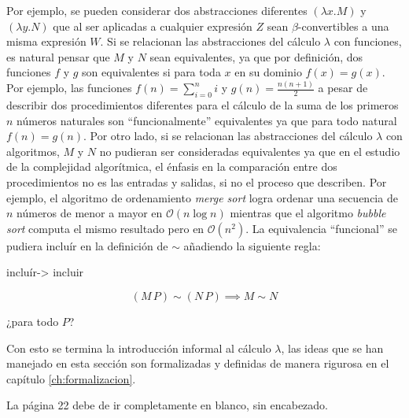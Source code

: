 Por ejemplo, se pueden considerar dos abstracciones diferentes \( (λx.M) \) y \( (λy.N) \) que al ser aplicadas a cualquier expresión \( Z \) sean \( β \)-convertibles a una misma expresión \( W \). Si se relacionan las abstracciones del cálculo \( λ \) con funciones, es natural pensar que \( M \) y \( N \) sean equivalentes, ya que por definición, dos funciones \( f \) y \( g \) son equivalentes si para toda \( x \) en su dominio \( f(x)=g(x) \). Por ejemplo, las funciones \( f(n)=\sum_{i=0}^{n}i \) y \( g(n)=\frac{n(n+1)}{2} \) a pesar de describir dos procedimientos diferentes para el cálculo de la suma de los primeros \( n \) números naturales son ``funcionalmente'' equivalentes ya que para todo natural \( f(n)=g(n) \). Por otro lado, si se relacionan las abstracciones del cálculo \( λ \) con algoritmos, \( M \) y \( N \) no pudieran ser consideradas equivalentes ya que en el estudio de la complejidad algorítmica, el énfasis en la comparación entre dos procedimientos no es las entradas y salidas, si no el proceso que describen. Por ejemplo, el algoritmo de ordenamiento \emph{merge sort} logra ordenar una secuencia de \( n \) números de menor a mayor en \( \mathcal{O}(n \log n) \) mientras que el algoritmo \emph{bubble sort} computa el mismo resultado pero en \( \mathcal{O}(n^2) \).  La equivalencia ``funcional'' se pudiera incluír en la definición de \( \sim \) añadiendo la siguiente regla:
\begin{Gutu}
incluír-> incluir
\end{Gutu}

\[ (M\, P) \sim (N\, P) \implies M \sim N \]

\begin{Gutu}
¿para todo $P$?
\end{Gutu}
Con esto se termina la introducción informal al cálculo \( λ \), las ideas que se han manejado en esta sección son formalizadas y definidas de manera rigurosa en el capítulo \ref{ch:formalizacion}.

\begin{Gutu}
La página 22 debe de ir completamente en blanco, sin encabezado.
\end{Gutu}

